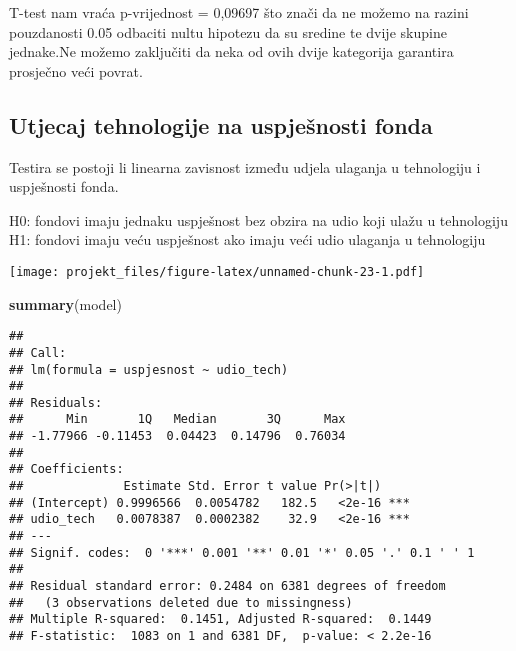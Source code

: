 \documentclass[
]{article}
\newenvironment{Shaded}{\begin{snugshade}}{\end{snugshade}}
\newcommand{\DataTypeTok}[1]{\textcolor[rgb]{0.13,0.29,0.53}{#1}}
\newcommand{\KeywordTok}[1]{\textcolor[rgb]{0.13,0.29,0.53}{\textbf{#1}}}
\newcommand{\NormalTok}[1]{#1}
\newcommand{\OperatorTok}[1]{\textcolor[rgb]{0.81,0.36,0.00}{\textbf{#1}}}
\newcommand{\StringTok}[1]{\textcolor[rgb]{0.31,0.60,0.02}{#1}}
\begin{document}
T-test nam vraća p-vrijednost = 0,09697 što znači da ne možemo na razini
pouzdanosti 0.05 odbaciti nultu hipotezu da su sredine te dvije skupine
jednake.Ne možemo zaključiti da neka od ovih dvije kategorija garantira
prosječno veći povrat.

\hypertarget{utjecaj-tehnologije-na-uspjeux161nosti-fonda}{%
\subsection{Utjecaj tehnologije na uspješnosti
fonda}\label{utjecaj-tehnologije-na-uspjeux161nosti-fonda}}

Testira se postoji li linearna zavisnost između udjela ulaganja u
tehnologiju i uspješnosti fonda.

H0: fondovi imaju jednaku uspješnost bez obzira na udio koji ulažu u
tehnologiju H1: fondovi imaju veću uspješnost ako imaju veći udio
ulaganja u tehnologiju

\begin{Shaded}
\end{Shaded}

\texttt{[image: projekt\_files/figure-latex/unnamed-chunk-23-1.pdf]}

\begin{Shaded}
\begin{Highlighting}[]
\KeywordTok{summary}\NormalTok{(model)}
\end{Highlighting}
\end{Shaded}

\begin{verbatim}
## 
## Call:
## lm(formula = uspjesnost ~ udio_tech)
## 
## Residuals:
##      Min       1Q   Median       3Q      Max 
## -1.77966 -0.11453  0.04423  0.14796  0.76034 
## 
## Coefficients:
##              Estimate Std. Error t value Pr(>|t|)    
## (Intercept) 0.9996566  0.0054782   182.5   <2e-16 ***
## udio_tech   0.0078387  0.0002382    32.9   <2e-16 ***
## ---
## Signif. codes:  0 '***' 0.001 '**' 0.01 '*' 0.05 '.' 0.1 ' ' 1
## 
## Residual standard error: 0.2484 on 6381 degrees of freedom
##   (3 observations deleted due to missingness)
## Multiple R-squared:  0.1451, Adjusted R-squared:  0.1449 
## F-statistic:  1083 on 1 and 6381 DF,  p-value: < 2.2e-16
\end{verbatim}
\end{document}
